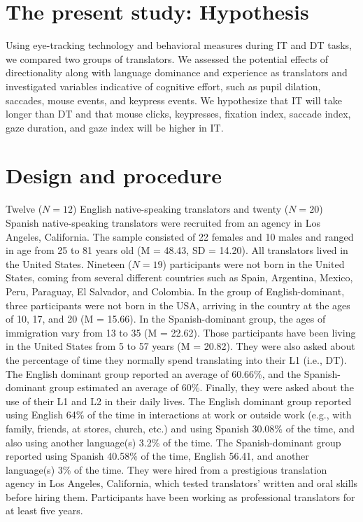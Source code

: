 \documentclass[output=paper]{langscibook}
\begin{document}
\section{The present study: Hypothesis}\largerpage
Using eye-tracking technology and behavioral measures during IT and DT tasks, we compared two groups of translators. We assessed the potential effects of directionality along with language dominance and experience as translators and investigated variables indicative of cognitive effort, such as pupil dilation, saccades, mouse events, and keypress events. We hypothesize that IT will take longer than DT and that mouse clicks, keypresses, fixation index, saccade index, gaze duration, and gaze index will be higher in IT.

\section{Design and procedure}
Twelve ($N = 12$) English native-speaking translators and twenty ($N = 20$) Spanish native-speaking translators were recruited from an agency in Los Angeles, California. The sample consisted of 22 females and 10 males and ranged in age from 25 to 81 years old (M = 48.43, SD = 14.20). All translators lived in the United States. Nineteen ($N = 19$) participants were not born in the United States, coming from several different countries such as Spain, Argentina, Mexico, Peru, Paraguay, El Salvador, and Colombia. In the group of English-dominant, three participants were not born in the USA, arriving in the country at the ages of 10, 17, and 20 (M = 15.66). In the Spanish-dominant group, the ages of immigration vary from 13 to 35 (M = 22.62). Those participants have been living in the United States from 5 to 57 years (M = 20.82). They were also asked about the percentage of time they normally spend translating into their L1 (i.e., DT). The English dominant group reported an average of 60.66\%, and the Spanish-dominant group estimated an average of 60\%. Finally, they were asked about the use of their L1 and L2 in their daily lives. The English dominant group reported using English 64\% of the time in interactions at work or outside work (e.g., with family, friends, at stores, church, etc.) and using Spanish 30.08\% of the time, and also using another language(s) 3.2\% of the time. The Spanish-dominant group reported using Spanish 40.58\% of the time, English 56.41, and another language(s) 3\% of the time. They were hired from a prestigious translation agency in Los Angeles, California, which tested translators’ written and oral skills before hiring them. Participants have been working as professional translators for at least five years.\largerpage[2]
\end{document}

